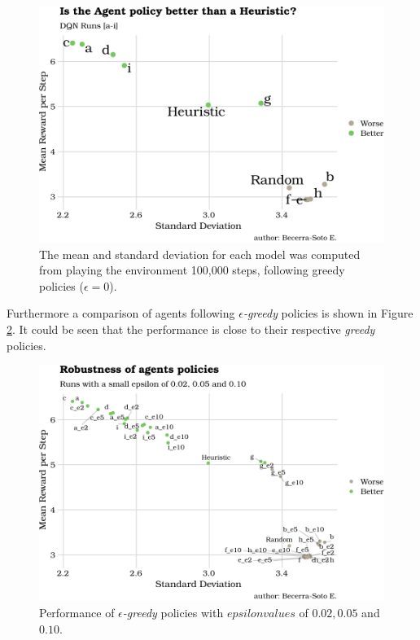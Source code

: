 \documentclass[
  openany]{book}
\begin{document}
\begin{figure}

{\centering \includegraphics{_main_files/figure-latex/sd-mean-1} 

}

\caption{The mean and standard deviation for each model was computed from playing the environment 100,000 steps, following greedy policies (\(\epsilon=0\)).}\label{fig:sd-mean}
\end{figure}

Furthermore a comparison of agents following \emph{\(\epsilon\)-greedy} policies is shown in Figure \ref{fig:sd-mean-epsilon}. It could be seen that the performance is close to their respective \emph{greedy} policies.



\begin{figure}

{\centering \includegraphics{_main_files/figure-latex/sd-mean-epsilon-1} 

}

\caption{Performance of \emph{\(\epsilon\)-greedy} policies with \(epsilon values\) of \(0.02, 0.05\) and \(0.10\).}\label{fig:sd-mean-epsilon}
\end{figure}
\end{document}

